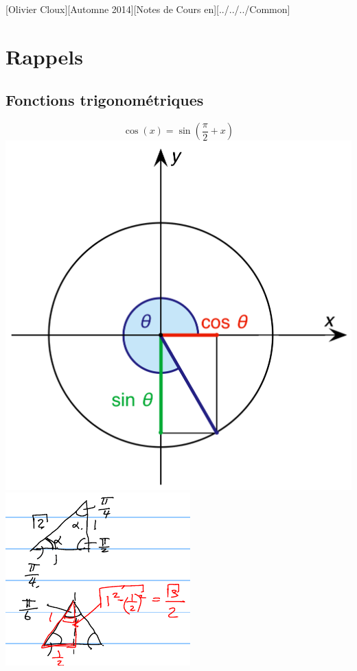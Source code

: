 \documentclass[12pt,a4paper]{article}
\begin{document}
[Olivier Cloux][Automne 2014][Notes de Cours en][../../../Common]
\tableofcontents

\section{Rappels}
\subsection{Fonctions trigonométriques}
\begin{center}
\[\cos(x) = \sin(\frac{\pi}{2} + x)\]
\includegraphics[scale=0.2]{illustrations_Analyse/sin_and_cos}
\includegraphics[scale=0.7]{illustrations_Analyse/trigo}\\
\end{center}
\end{document}

